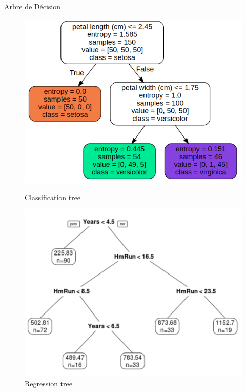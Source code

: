 \documentclass{beamer}
\begin{document}
\begin{frame}{Arbre de Décision}
	\begin{center}
		\begin{figure}
		    \begin{minipage}[t]{0.45\linewidth}
			\centering
			\includegraphics[width=\linewidth]{iris.png}
			\caption{Classification tree}
		\end{minipage}
		\hfill
		\begin{minipage}[t]{0.45\linewidth}
			\centering
			\includegraphics[width=\linewidth]{Rtree3.png}
			\caption{Regression tree}
		\end{minipage}
\end{figure}
\end{center}
\end{frame}
\end{document}
